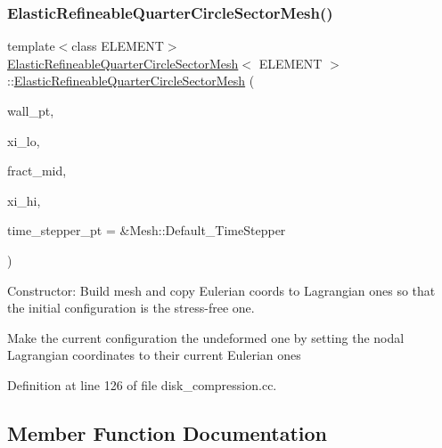 \subsubsection{\texorpdfstring{Elastic\+Refineable\+Quarter\+Circle\+Sector\+Mesh()}{ElasticRefineableQuarterCircleSectorMesh()}}
{\footnotesize\ttfamily template$<$class E\+L\+E\+M\+E\+NT$>$ \\
\hyperlink{classElasticRefineableQuarterCircleSectorMesh}{Elastic\+Refineable\+Quarter\+Circle\+Sector\+Mesh}$<$ E\+L\+E\+M\+E\+NT $>$\+::\hyperlink{classElasticRefineableQuarterCircleSectorMesh}{Elastic\+Refineable\+Quarter\+Circle\+Sector\+Mesh} (\begin{DoxyParamCaption}\item[{Geom\+Object $\ast$}]{wall\+\_\+pt,  }\item[{const double \&}]{xi\+\_\+lo,  }\item[{const double \&}]{fract\+\_\+mid,  }\item[{const double \&}]{xi\+\_\+hi,  }\item[{Time\+Stepper $\ast$}]{time\+\_\+stepper\+\_\+pt = {\ttfamily \&Mesh\+:\+:Default\+\_\+TimeStepper} }\end{DoxyParamCaption})\hspace{0.3cm}{\ttfamily [inline]}}



Constructor\+: Build mesh and copy Eulerian coords to Lagrangian ones so that the initial configuration is the stress-\/free one. 

Make the current configuration the undeformed one by setting the nodal Lagrangian coordinates to their current Eulerian ones 

Definition at line 126 of file disk\+\_\+compression.\+cc.



\subsection{Member Function Documentation}
\mbox{\label{classElasticRefineableQuarterCircleSectorMesh_ad9734ea7aee2141079544bb782d3ace1}} 
